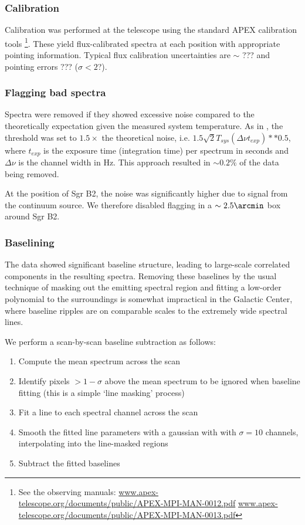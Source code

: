 \subsubsection{Calibration}
Calibration was performed at the telescope using the standard APEX calibration tools
\footnote{See the observing manuals:
\url{www.apex-telescope.org/documents/public/APEX-MPI-MAN-0012.pdf}
\url{www.apex-telescope.org/documents/public/APEX-MPI-MAN-0013.pdf} }.
These yield flux-calibrated spectra at each position with appropriate pointing
information.  Typical flux calibration uncertainties are $\sim$ ??? and
pointing errors ??? ($\sigma<2$\arcsec ?).

\subsubsection{Flagging bad spectra}
Spectra were removed if they showed excessive noise compared to the
theoretically expectation given the measured system temperature.  As in
\citet{Ao2013a}, the threshold was set to $1.5\times$ the theoretical noise,
i.e. $1.5 \sqrt{2} T_{sys} (\Delta\nu t_{exp})**0.5$, where $t_{exp}$ is the
exposure time (integration time) per spectrum in seconds and $\Delta\nu$ is the
channel width in Hz.  This approach resulted in $\sim0.2\%$ of the data being
removed.  

At the position of Sgr B2, the noise was significantly higher due to signal
from the continuum source.  We therefore disabled flagging in a
$\sim2.5\arcmin$ box around Sgr B2.


\subsubsection{Baselining}
\label{sec:baseline}
The data showed significant baseline structure, leading to large-scale
correlated components in the resulting spectra.  Removing these baselines by
the usual technique of masking out the emitting spectral region and fitting a
low-order polynomial to the surroundings is somewhat impractical in the
Galactic Center, where baseline ripples are on comparable scales to the
extremely wide spectral lines.

We perform a scan-by-scan baseline subtraction as follows: 
\begin{enumerate}
    \item Compute the mean spectrum across the scan
    \item Identify pixels $>1-\sigma$ above the mean spectrum to be ignored
        when baseline fitting (this is a simple `line masking' process)
    \item Fit a line to each spectral channel across the scan
    \item Smooth the fitted line parameters with a gaussian with with
        $\sigma=10$ channels, interpolating into the line-masked regions
    \item Subtract the fitted baselines
\end{enumerate}

